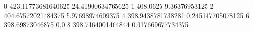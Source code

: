 0 423.11773681640625 24.41900634765625
1 408.0625 9.36376953125
2 404.67572021484375 5.97698974609375
4 398.9438781738281 0.245147705078125
6 398.69873046875 0.0
8 398.7164001464844 0.017669677734375
